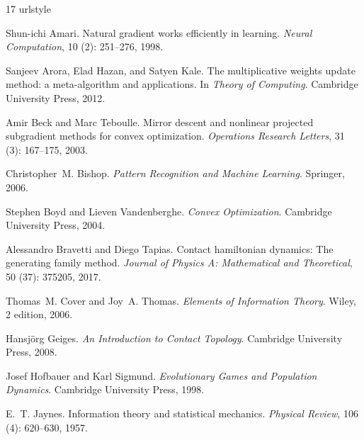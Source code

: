 \documentclass[10pt,a4paper]{amsart}
\numberwithin{equation}{section}
\theoremstyle{plain}
\theoremstyle{definition}
\theoremstyle{remark}
\newcommand{\1}{\mathbbm{1}}
\begin{document}
\begin{thebibliography}{17}
\providecommand{\natexlab}[1]{#1}
\providecommand{\url}[1]{\texttt{#1}}
\expandafter\ifx\csname urlstyle\endcsname\relax
  \providecommand{\doi}[1]{doi: #1}\else
  \providecommand{\doi}{doi: \begingroup \urlstyle{rm}\Url}\fi

Shun-ichi Amari.
\newblock Natural gradient works efficiently in learning.
\newblock \emph{Neural Computation}, 10 (2): 251--276, 1998.

Sanjeev Arora, Elad Hazan, and Satyen Kale.
\newblock The multiplicative weights update method: a meta-algorithm and
  applications.
\newblock In \emph{Theory of Computing}. Cambridge University Press, 2012.

Amir Beck and Marc Teboulle.
\newblock Mirror descent and nonlinear projected subgradient methods for convex
  optimization.
\newblock \emph{Operations Research Letters}, 31 (3):
  167--175, 2003.

Christopher~M. Bishop.
\newblock \emph{Pattern Recognition and Machine Learning}.
\newblock Springer, 2006.

Stephen Boyd and Lieven Vandenberghe.
\newblock \emph{Convex Optimization}.
\newblock Cambridge University Press, 2004.

Alessandro Bravetti and Diego Tapias.
\newblock Contact hamiltonian dynamics: The generating family method.
\newblock \emph{Journal of Physics A: Mathematical and Theoretical},
  50 (37): 375205, 2017.

Thomas~M. Cover and Joy~A. Thomas.
\newblock \emph{Elements of Information Theory}.
\newblock Wiley, 2 edition, 2006.

Hansj{\"o}rg Geiges.
\newblock \emph{An Introduction to Contact Topology}.
\newblock Cambridge University Press, 2008.

Josef Hofbauer and Karl Sigmund.
\newblock \emph{Evolutionary Games and Population Dynamics}.
\newblock Cambridge University Press, 1998.

E.~T. Jaynes.
\newblock Information theory and statistical mechanics.
\newblock \emph{Physical Review}, 106 (4): 620--630, 1957.


\end{thebibliography}
\end{document}
